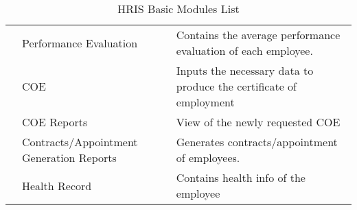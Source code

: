 \begin{table}[H]
\begin{tabular}{@{}p{2cm}p{3.5cm}p{9cm}@{}}
                         & Performance Evaluation                   & Contains the average performance evaluation of each employee.                         \\
                         & COE                                      & Inputs the necessary data to produce the certificate of employment                    \\
                         & COE Reports                              & View of the newly requested COE                                                       \\
                         & Contracts/Appointment Generation Reports & Generates contracts/appointment of employees.                                         \\
                         & Health Record                            & Contains health info of the employee                                                  \\ \bottomrule
    \end{tabular}
    \caption{HRIS Basic Modules List}
    \label{tab:my_label}
\end{table}
    
